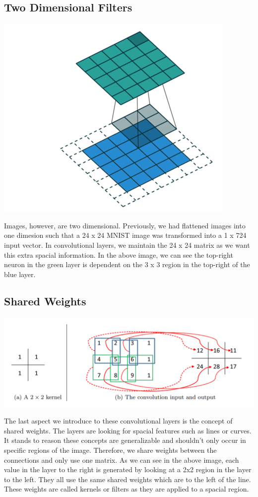 \documentclass{exam}
\begin{document}
\subsection{Two Dimensional Filters}
\begin{center}
\includegraphics[scale=0.3]{convgif}
\end{center}
Images, however, are two dimensional. Previously, we had flattened images into one dimesion such that a 24 x 24 MNIST image was transformed into a 1 x 724 input vector. In convolutional layers, we maintain the 24 x 24 matrix as we want this extra spacial information. In the above image, we can see the top-right neuron in the green layer is dependent on the 3 x 3 region in the top-right of the blue layer.

\subsection{Shared Weights}
\begin{center}
\includegraphics[scale=0.7]{ConvApplied.PNG}
\end{center}
The last aspect we introduce to these convolutional layers is the concept of shared weights. The layers are looking for spacial features such as lines or curves. It stands to reason these concepts are generalizable and shouldn't only occur in specific regions of the image. Therefore, we share weights between the connections and only use one matrix. As we can see in the above image, each value in the layer to the right is generated by looking at a 2x2 region in the layer to the left. They all use the same shared weights which are to the left of the line. These weights are called kernels or filters as they are applied to a spacial region.
\end{document}
